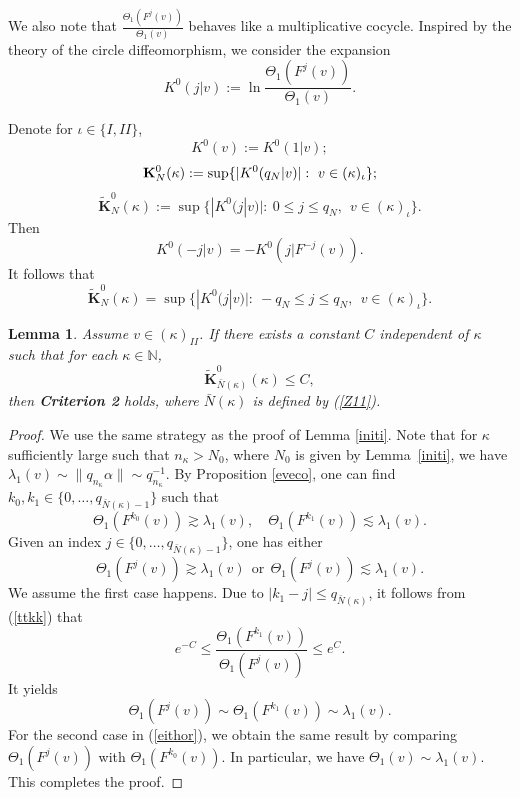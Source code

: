 \documentclass{amsart}
\newtheorem{Lemma}[Definition]{Lemma}
\theoremstyle{definition}
\begin{document}
We also note that $\frac{\Theta_1(F^j(v))}{\Theta_1(v)}$ behaves like a multiplicative cocycle. Inspired by the theory of  the circle diffeomorphism, we consider the expansion
\[K^0(j|v):=\ln \frac{\Theta_1(F^j(v))}{\Theta_1(v)}.\]



Denote for $\iota\in \{I, II\}$,
\[{K^0(v):=K^0(1|v)};\]
\[\bold{K}_N^0(\kappa):=\sup\{|K^0(q_N|v)|:\ v\in (\kappa)_{\iota}\};\]
\begin{equation}\label{bigK}
\widetilde{\mathbf{K}}_N^0(\kappa):=\sup\{|K^0(j|v)|:\ 0\leq j\leq q_N,\ \ v\in (\kappa)_{\iota}\}.
\end{equation}
Then
\[K^0(-j|v)=-K^0(j|F^{-j}(v)).\]
It follows that
\begin{equation}\label{skno}
\widetilde{\mathbf{K}}_N^0(\kappa)=\sup\{|K^0(j|v)|:\ -q_N\leq j\leq q_N,\ \ v\in (\kappa)_{\iota}\}.
\end{equation}

\begin{Lemma}\label{Cc} Assume $v\in (\kappa)_{II}$.
If there exists a constant $C$ independent of $\kappa$ such that for each $\kappa\in \mathbb{N}$,
\begin{equation}\label{ttkk}
\widetilde{\mathbf{K}}_{\bar{N}(\kappa)}^0(\kappa)\leq C,
\end{equation}
then {\bf Criterion 2} holds, where $\bar{N}(\kappa)$ is defined by (\ref{Z11}).
\end{Lemma}
\begin{proof} We use the same strategy as the proof of Lemma \ref{initi}. Note that for $\kappa$ sufficiently large such that $n_{\kappa} > N_0$, where $N_0$ is given by Lemma~\ref{initi}, we have $\lambda_1(v) \sim \|q_{n_\kappa} \alpha\| \sim q_{n_\kappa}^{-1}$.
By Proposition \ref{eveco}, one can find $k_0,k_1\in \{0,\ldots,q_{\bar{N}(\kappa)-1}\}$ such that
\[\Theta_1(F^{k_0}(v))\gtrsim \lambda_1(v),\quad  \Theta_1(F^{k_1}(v))\lesssim\lambda_1(v).\]
Given an index $j\in \{0,\ldots,q_{\bar{N}(\kappa)-1}\}$, one has either
\begin{equation}\label{eithor}
\Theta_1(F^{j}(v))\gtrsim \lambda_1(v)\ \ \mathrm{or}\ \ \Theta_1(F^{j}(v))\lesssim\lambda_1(v).
\end{equation}
We assume the first case happens.
Due to $|k_1-j|\leq q_{\bar{N}(\kappa)}$, it follows from (\ref{ttkk}) that
\[e^{-C}\leq \frac{\Theta_1(F^{k_1}(v))}{\Theta_1(F^{j}(v))}\leq e^C.\]
It yields
\[\Theta_1(F^{j}(v))\sim\Theta_1(F^{k_1}(v))\sim \lambda_1(v).\]
For the second case in (\ref{eithor}), we obtain the same result by comparing $\Theta_1(F^{j}(v))$ with $\Theta_1(F^{k_0}(v))$.
In particular, we have $\Theta_1(v)\sim \lambda_1(v)$.
This completes the proof.
\end{proof}
\end{document}

